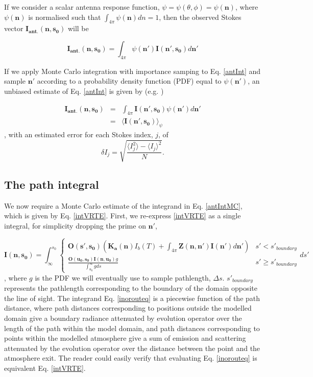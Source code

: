 If we consider a scalar antenna response function,
$\psi=\psi(\theta,\phi)=\psi(\mathbf{n})$, where $\psi(\mathbf{n})$ is
normalised such that $\int_{4\pi}\psi(\mathbf{n})dn=1$, then the
observed Stokes vector $\mathbf{I_{ant.}(n,s_0)}$ will be

\begin{equation}
\mathbf{I_{ant.}(n,s_0)}=\int_{4\pi}\psi(\mathbf{n'})\mathbf{I(n',s_0)}d\mathbf{n'}
\label{antInt}
\end{equation}

If we apply Monte Carlo integration with importance samping to
Eq. \ref{antInt} and sample $\mathbf{n'}$ according to a probability
density function (PDF) equal to $\psi(\mathbf{n'})$, an unbiased
estimate of Eq. \ref{antInt} is given by (e.g. \cite{press:92})

\begin{eqnarray}
\mathbf{I_{ant.}(n,s_0)}&=&\int_{4\pi}\mathbf{I(n',s_0)}\psi(\mathbf{n'})d\mathbf{n'}\\
&=&\langle \mathbf{I(n',s_0)} \rangle_\psi
\label{antIntMC}
\end{eqnarray}
, with an estimated error for each Stokes index, $j$,  of
\begin{equation}
\delta I_j=\sqrt{\frac{\langle I_j^2\rangle-\langle I_j\rangle^2}{N}}.
\label{error}
\end{equation}

\subsection{The path integral}
\label{sec:path_integral}
We now require a Monte Carlo estimate of the integrand in
Eq. \ref{antIntMC}, which is given by Eq. \ref{intVRTE}.  First, we
re-express \ref{intVRTE} as a single integral, for simplicity dropping
the prime on $\mathbf{n'}$,

\begin{equation}
\mathbf{I(n,s_0)}=\int^{s_0}_\infty\left\{\begin{array}{rl}
\mathbf{O(s',s_0)}\left(\mathbf{K_a(n)}I_b(T)
+\int_{4\pi}\mathbf{Z(n,n')}\mathbf{I(n')}d\mathbf{n'}\right) & s'< s'_{boundary} \\
\frac{\mathbf{O(u_0,s_0)I(n,u_0)}g}{\int^\infty_{u_0}gds} & s'\ge s'_{boundary}
\end{array}ds'\right.
\label{inorouteq}
\end{equation}
, where $g$ is the PDF we will eventually use to sample pathlength,
$\Delta s$. $s'_{boundary}$ represents the pathlength corresponding to
the boundary of the domain opposite the line of sight.
The integrand Eq. \ref{inorouteq} is a piecewise function of the
path distance, where path distances corresponding to positions outside
the modelled domain give a boundary radiance attenuated by evolution
operator over the length of the path within the model domain, and path
distances corresponding to points within the modelled atmosphere give
a sum of emission and scattering attenuated by the evolution operator
over the distance between the point and the atmosphere exit. 
The reader
could easily verify that evaluating Eq. \ref{inorouteq} is equivalent
Eq. \ref{intVRTE}. 

